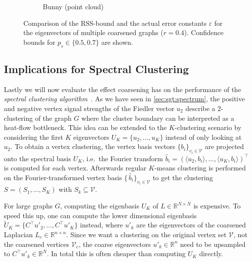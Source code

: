\begin{figure}[ht]
\begin{subfigure}{0.33\textwidth}
		\caption{Bunny (point cloud)}\label{fig:cons:example:bunny}
	\end{subfigure}
	\caption{%
		Comparison of the RSS-bound and the actual error constants $\varepsilon$ for the eigenvectors of multiple coarsened graphs ($r = 0.4$).
		Confidence bounds for $p_s \in \{0.5, 0.7\}$ are shown.
	}\label{fig:cons:example}
\end{figure}

\subsection{Implications for Spectral Clustering}%
\label{sec:cons:sc}

Lastly we will now evaluate the effect coarsening has on the performance of the \textit{spectral clustering algorithm}~\cite{Luxburg2007}.
As we have seen in \cref{sec:sgt:spectrum}, the positive and negative vertex signal strengths of the Fiedler vector $u_2$ describe a $2$-clustering of the graph $G$ where the cluster boundary can be interpreted as a heat-flow bottleneck.
This idea can be extended to the $K$-clustering scenario by considering the first $K$ eigenvectors $U_K = \{ u_2, \dots, u_K \}$ instead of only looking at $u_2$.
To obtain a vertex clustering, the vertex basis vectors ${\{ b_i \}}_{v_i \in \mathcal{V}}$ are projected onto the spectral basis $U_K$, i.e.\ the Fourier transform $\widehat{b}_i = {(\langle u_2, b_i \rangle, \dots, \langle u_K, b_i \rangle)}^\top$ is computed for each vertex.
Afterwards regular $K$-means clustering is performed on the Fourier-transformed vertex basis ${\{\,\widehat{b}_i \}}_{v_i \in \mathcal{V}}$ to get the clustering $S = (S_1, \dots, S_K)$ with $S_k \subseteq \mathcal{V}$.

For large graphs $G$, computing the eigenbasis $U_K$ of $L \in \mathbb{R}^{N \times N}$ is expensive.
To speed this up, one can compute the lower dimensional eigenbasis $\widetilde{U}_K = \{ C^\top u'_2, \dots, C^\top u'_K \}$ instead, where $u'_k$ are the eigenvectors of the coarsened Laplacian $L_c \in \mathbb{R}^{n \times n}$.
Since we want a clustering on the original vertex set $\mathcal{V}$, not the coarsened vertices $\mathcal{V}_c$, the coarse eigenvectors $u'_k \in \mathbb{R}^n$ need to be upsampled to $C^\top u'_k \in \mathbb{R}^N$.
In total this is often cheaper than computing $U_K$ directly.

